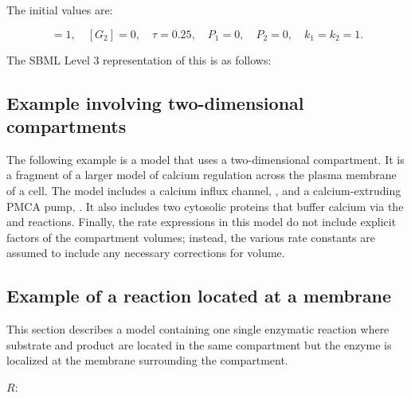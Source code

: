 The initial values are:
\begin{linenomath}
\begin{equation*}
  [G_1] = 1, \quad [G_2] = 0, \quad \tau = 0.25, \quad P_1 = 0, \quad P_2 = 0, \quad k_1 = k_2 = 1.
\end{equation*}
\end{linenomath}

The SBML Level 3 representation of this is as follows:



\subsection{Example involving two-dimensional compartments}
\label{sec:two-dimensional-eg}

The following example is a model that uses a two-dimensional
compartment.  It is a fragment of a larger model of calcium
regulation across the plasma membrane of a cell.  The model
includes a calcium influx channel, , and a
calcium-extruding PMCA pump, .  It also includes two
cytosolic proteins that buffer calcium via the
 and
 reactions.  Finally, the
rate expressions in this model do not include explicit factors of
the compartment volumes; instead, the various rate constants are
assumed to include any necessary corrections for volume.



\subsection{Example of a reaction located at a membrane}
\label{sec:eg:membrane-reaction}

\label{sec:reaction-membrane-eg}This section describes a model containing
one single enzymatic reaction where substrate and product are located
in the same compartment but the enzyme is localized at the membrane
surrounding the compartment.

\begin{center}
$R$: 
\par\end{center}

